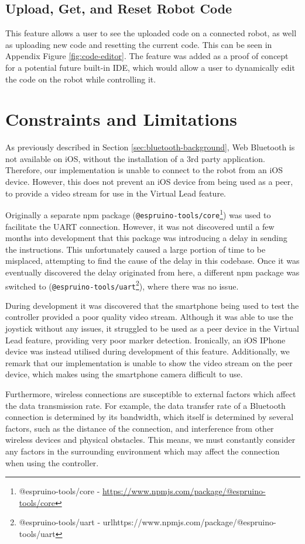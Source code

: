 \documentclass{l4proj}
\begin{document}
\subsection{Upload, Get, and Reset Robot Code}
This feature allows a user to see the uploaded code on a connected robot, as well as uploading new code and resetting the current code. This can be seen in Appendix Figure \ref{fig:code-editor}. The feature was added as a proof of concept for a potential future built-in IDE, which would allow a user to dynamically edit the code on the robot while controlling it. 


\section{Constraints and Limitations}
As previously described in Section \ref{sec:bluetooth-background}, Web Bluetooth is not available on iOS, without the installation of a 3rd party application. Therefore, our implementation is unable to connect to the robot from an iOS device. However, this does not prevent an iOS device from being used as a peer, to provide a video stream for use in the Virtual Lead feature.

Originally a separate npm package (\lstinline{@espruino-tools/core}\footnote{@espruino-tools/core - \url{https://www.npmjs.com/package/@espruino-tools/core}}) was used to facilitate the UART connection. However, it was not discovered until a few months into development that this package was introducing a delay in sending the instructions. This unfortunately caused a large portion of time to be misplaced, attempting to find the cause of the delay in this codebase. Once it was eventually discovered the delay originated from here, a different npm package was switched to (\lstinline{@espruino-tools/uart}\footnote{@espruino-tools/uart - url{https://www.npmjs.com/package/@espruino-tools/uart}}), where there was no issue.

During development it was discovered that the smartphone being used to test the controller provided a poor quality video stream. Although it was able to use the joystick without any issues, it struggled to be used as a peer device in the Virtual Lead feature, providing very poor marker detection. Ironically, an iOS IPhone device was instead utilised during development of this feature. Additionally, we remark that our implementation is unable to show the video stream on the peer device, which makes using the smartphone camera difficult to use.

Furthermore, wireless connections are susceptible to external factors which affect the data transmission rate. For example, the data transfer rate of a Bluetooth connection is determined by its bandwidth, which itself is determined by several factors, such as the distance of the connection, and interference from other wireless devices and physical obstacles. This means, we must constantly consider any factors in the surrounding environment which may affect the connection when using the controller.
\end{document}
